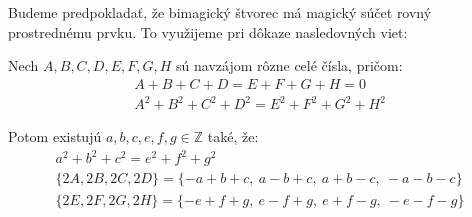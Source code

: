 

Budeme predpokladať, že bimagický štvorec má magický súčet rovný prostrednému prvku. To využijeme pri dôkaze nasledovných viet:

\begin{theorem}
\label{5x5bimagic2}
Nech $A,B,C,D,E,F,G,H$ sú navzájom rôzne celé čísla, pričom:
\begin{gather*}
A + B + C + D = E + F + G + H = 0 \\
A^2 + B^2 + C^2 + D^2 = E^2 + F^2 + G^2 + H^2
\end{gather*}

Potom existujú $a,b,c,e,f,g \in \mathbb{Z}$ také, že:
\begin{gather*}
a^2 + b^2 + c^2 = e^2 + f^2 + g^2 \\
\{2A,2B,2C,2D\} = \{-a+b+c,~a-b+c,~a+b-c,~-a-b-c\} \\
\{2E,2F,2G,2H\} = \{-e+f+g,~e-f+g,~e+f-g,~-e-f-g\}
\end{gather*}

\end{theorem}

